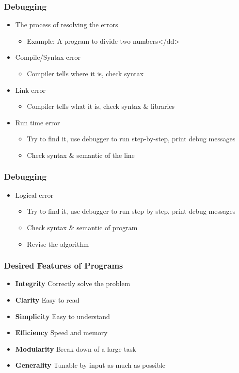 \documentclass{../c-lecture}
\begin{document}
\begin{frame}
  \frametitle{Debugging}
  \begin{itemize}
    \item The process of resolving the errors
    \begin{itemize}
      \item Example: A program to divide two numbers</dd>
    \end{itemize}

    \item Compile/Syntax error
    \begin{itemize}
      \item Compiler tells where it is, check syntax
    \end{itemize}

    \item Link error
    \begin{itemize}
      \item Compiler tells what it is, check syntax \& libraries
    \end{itemize}

    \item Run time error
    \begin{itemize}
      \item
        Try to find it, use debugger to run step-by-step, print debug messages
      \item Check syntax \& semantic of the line
    \end{itemize}
  \end{itemize}
\end{frame}

\begin{frame}
  \frametitle{Debugging}
  \begin{itemize}
    \item Logical error
      \begin{itemize}
        \item
          Try to find it, use debugger to run step-by-step, print debug messages
        \item Check syntax \& semantic of program
        \item Revise the algorithm
      \end{itemize}
  \end{itemize}
\end{frame}

\begin{frame}
  \frametitle{Desired Features of Programs}
  \begin{itemize}
    \item \textbf{Integrity}
    Correctly solve the problem
    \item \textbf{Clarity}
    Easy to read
    \item \textbf{Simplicity}
    Easy to understand
    \item \textbf{Efficiency}
    Speed and memory
    \item \textbf{Modularity}
    Break down of a large task
    \item \textbf{Generality}
    Tunable by input as much as possible
  \end{itemize}
\end{frame}
\end{document}
